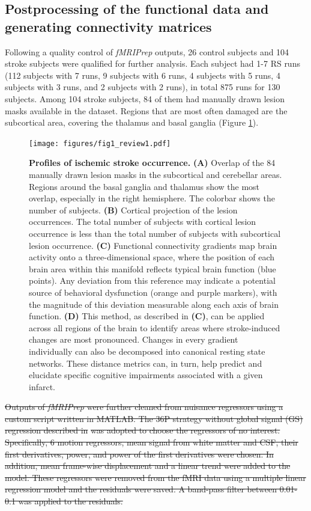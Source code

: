 \documentclass[fleqn,10pt]{wlscirep}
\begin{document}
\subsection*{Postprocessing of the functional data and generating connectivity matrices}
Following a quality control of \emph{fMRIPrep} outputs, 26 control subjects and 104 stroke subjects were qualified for further analysis. Each subject had 1-7 RS runs (112 subjects with 7 runs, 9 subjects with 6 runs, 4 subjects with 5 runs, 4 subjects with 3 runs, and 2 subjects with 2 runs), in total  875 runs for 130 subjects. Among 104 stroke subjects, 84 of them had manually drawn lesion masks available in the dataset. Regions that are most often damaged are the subcortical area, covering the thalamus and basal ganglia (Figure \ref{fig:lesion_locations}).

\begin{figure}
\centering
\texttt{[image: figures/fig1\_review1.pdf]}
\caption{\label{fig:lesion_locations} \textbf{Profiles of ischemic stroke occurrence.} \textbf{(A)} Overlap of the 84 manually drawn lesion masks in the subcortical and cerebellar areas. Regions around the basal ganglia and thalamus show the most overlap, especially in the right hemisphere. The colorbar shows the number of subjects. \textbf{(B) } Cortical projection of the lesion occurrences. The total number of subjects with cortical lesion occurrence is less than the total number of subjects with subcortical lesion occurrence. \color{blue} \textbf{(C)} Functional connectivity gradients map brain activity onto a three-dimensional space, where the position of each brain area within this manifold reflects typical brain function (blue points). Any deviation from this reference may indicate a potential source of behavioral dysfunction (orange and purple markers), with the magnitude of this deviation measurable along each axis of brain function. \textbf{(D)} This method, as described in \textbf{(C)}, can be applied across all regions of the brain to identify areas where stroke-induced changes are most pronounced. Changes in every gradient individually can also be decomposed into canonical resting state networks. These distance metrics can, in turn, help predict and elucidate specific cognitive impairments associated with a given infarct. \color{black}} 
\end{figure}

\color{red} \st{Outputs of \textit{fMRIPrep} were further cleaned from nuisance regressors using a custom script written in MATLAB. The 36P strategy without global signal (GS) regression described in} \citet{satterthwaite_2013} \st{was adopted to choose the regressors of no interest. Specifically, 6 motion regressors, mean signal from white matter and CSF, their first derivatives, power, and power of the first derivatives were chosen. In addition, mean frame-wise displacement and a linear trend were added to the model. These regressors were removed from the fMRI data using a multiple linear regression model and the residuals were saved. A band-pass filter between 0.01-0.1 was applied to the residuals.} \color{black}
\end{document}
